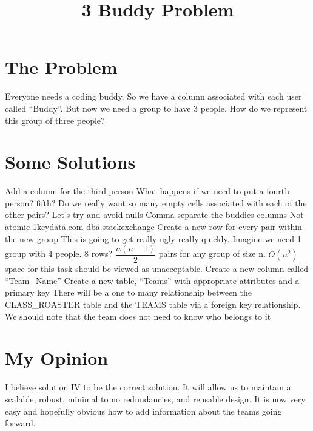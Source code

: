 \documentclass{article}
\title{3 Buddy Problem}
\begin{document}
\maketitle

\section{The Problem}
Everyone needs a coding buddy. So we have a column associated with each user called “Buddy”. But now we need a group to have 3 people. How do we represent this group of three people?

\section{Some Solutions}
\begin{outline}[enumerate]
    \1 Add a column for the third person
        \2 What happens if we need to put a fourth person? fifth?
        \2 Do we really want so many empty cells associated with each of the other pairs?
            \3 Let’s try and avoid nulls
    \1 Comma separate the buddies columns
        \2 Not atomic
            \3 \href{https://www.1keydata.com/database-normalization/first-normal-form-1nf.php#:~:text=An\%20atomic\%20value\%20is\%20a,columns\%20that\%20are\%20closely\%20related.}{1keydata.com}
            \3 \href{https://dba.stackexchange.com/questions/2342/what-is-atomic-relation-in-first-normal-form}{dba.stackexchange}
    \1 Create a new row for every pair within the new group
        \2 This is going to get really ugly really quickly. Imagine we need 1 group with 4 people. 8 rows?
        \2 $\dfrac{n(n-1)}{2}$ pairs for any group of size n.
        \2 $O(n^2)$ space for this task should be viewed as unacceptable.
    \1 Create a new column called “Team\_Name”
        \2 Create a new table, “Teams'' with appropriate attributes and a primary key
        \2 There will be a one to many relationship between the CLASS\_ROASTER table and the TEAMS table via a foreign key relationship.
        \2 We should note that the team does not need to know who belongs to it
\end{outline}

\section{My Opinion}  I believe solution IV to be the correct solution. It will allow us to maintain a scalable, robust, minimal to no redundancies, and reusable design. It is now very easy and hopefully obvious how to add information about the teams going forward.





  
\end{document}
